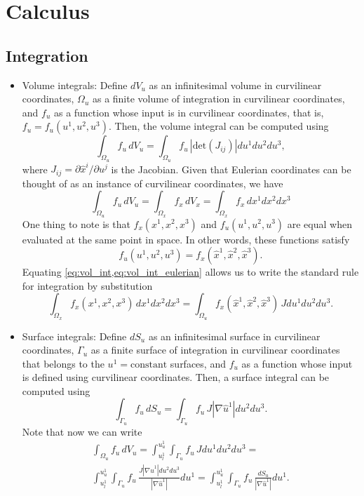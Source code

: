 \documentclass[11pt]{article}
\begin{document}
\section{Calculus}
\subsection{Integration}
\begin{itemize}

\item Volume integrals: Define $d V_u$ as an infinitesimal volume in curvilinear coordinates, $\Omega_u$ as a finite volume of integration in curvilinear coordinates, and $f_u$ as a function whose input is in curvilinear coordinates, that is, $f_u = f_u(u^1,u^2,u^3)$. Then, the volume integral can be computed using
\begin{equation}
\label{eq:vol_int}
    \int_{\Omega_u} f_u \, d V_u = \int_{\Omega_u} f_u \, |\text{det}(J_{ij})| du^1 du^2 du^3,
\end{equation}
where $J_{ij} = \partial \hat{x}^i / \partial u^j$ is the Jacobian. Given that Eulerian coordinates can be thought of as an instance of curvilinear coordinates, we have
\begin{equation}
\label{eq:vol_int_eulerian}
    \int_{\Omega_u} f_u \, dV_u =  \int_{\Omega_x} f_x \, dV_x = \int_{\Omega_x} f_x \, dx^1 dx^2 dx^3 
\end{equation}
One thing to note is that $f_x(x^1,x^2,x^3)$ and $f_u(u^1,u^2,u^3)$ are equal when evaluated at the same point in space.
In other words, these functions satisfy
\begin{equation}
    f_u(u^1,u^2,u^3) = f_x(\hat{x}^1, \hat{x}^2, \hat{x}^3).
\end{equation}
Equating \cref{eq:vol_int,eq:vol_int_eulerian} allows us to write the standard rule for integration by substitution
\begin{equation}
    \int_{\Omega_x} f_x(x^1,x^2,x^3) \, dx^1 dx^2 dx^3 = \int_{\Omega_u} f_x(\hat{x}^1, \hat{x}^2, \hat{x}^3) \, J du^1 du^2 du^3 .
\end{equation}

\item Surface integrals: Define $d S_u$ as an infinitesimal surface in curvilinear coordinates, $\Gamma_u$ as a finite surface of integration in curvilinear coordinates that belongs to the $u^1 = \text{constant}$ surfaces, and $f_u$ as a function whose input is defined using curvilinear coordinates. Then, a surface integral can be computed using 
\begin{equation}
    \int_{\Gamma_u} f_u\, d S_u = \int_{\Gamma_u} f_u \, J | \nabla \hat{u}^1| du^2 du^3.
\end{equation}
Note that now we can write
\begin{multline}
\label{eq:int_from_vol_surf}
    \int_{\Omega_u} f_u \,dV_u = \int_{u^1_l}^{u^1_u} \int_{\Gamma_u} f_u \, J du^1 du^2 du^3 = \\ 
    \int_{u^1_l}^{u^1_u} \int_{\Gamma_u} f_u \, \frac{J | \nabla \hat{u}^1| du^2 du^3}{| \nabla \hat{u}^1 |} du^1 = \int_{u^1_l}^{u^1_u} \int_{\Gamma_u} f_u \, \frac{dS_u}{|\nabla \hat{u}^1|} du^1.
\end{multline}


\end{itemize}
\end{document}
